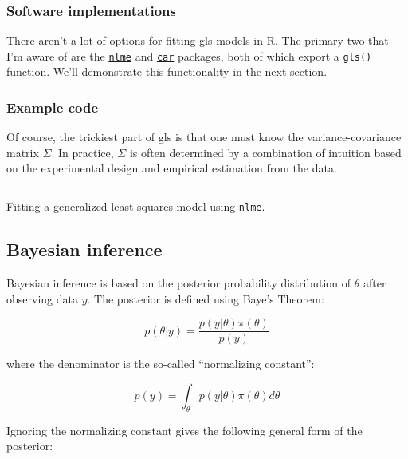 \documentclass{report}
\begin{document}
\subsubsection{Software implementations}

There aren't a lot of options for fitting \gls{gls} models in R. The primary two that I'm aware of are the \href{https://cran.r-project.org/web/packages/nlme/index.html}{\texttt{nlme}} and \href{https://cran.r-project.org/web/packages/car/index.html}{\texttt{car}} packages, both of which export a \texttt{gls()} function. We'll demonstrate this functionality in the next section. 

\subsubsection{Example code}

Of course, the trickiest part of \gls{gls} is that one must know the variance-covariance matrix $\Sigma$. In practice, $\Sigma$ is often determined by a combination of intuition based on the experimental design and empirical estimation from the data. 

\begin{listing}[h!]
\inputminted{r}{Example-Code/generalized_least_squares.R}
\caption{Fitting a generalized least-squares model using \texttt{nlme}.}
\label{listing:gls-example}
\end{listing}

\subsection{Bayesian inference}\label{sec:bayes}

Bayesian inference is based on the posterior probability distribution of $\theta$ after observing data $y$. The posterior is defined using Baye's Theorem:

\begin{equation}\label{eq:ols-bayes-posterior}
    p(\theta | y) = \frac{p(y | \theta) \pi(\theta)}{p(y)}
\end{equation}

where the denominator is the so-called ``normalizing constant'':

\begin{equation}\label{eq:ols-bayes-norm-constant}
    p(y) = \int_\theta p(y | \theta) \pi(\theta) d\theta
\end{equation}

Ignoring the normalizing constant gives the following general form of the posterior:
\end{document}
